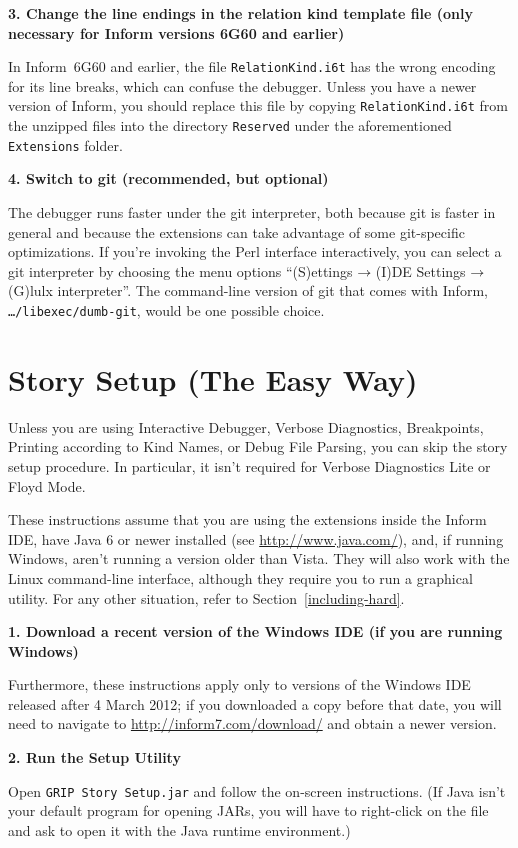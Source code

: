\documentclass{book}
\newcommand{\lastpagebreak}{\vfill\pagebreak}
\newcommand{\nil}{{\null}}
\newcommand{\thento}{\(\nil\rightarrow\nil\)}
\newcommand{\impatiencesection}[1]{\section{#1}\addcontentsline{toi}{section}{#1}}
\begin{document}
\textbf{3. Change the line endings in the relation kind template file (only
  necessary for Inform versions 6G60 and earlier)}

In Inform~6G60 and earlier, the file \texttt{RelationKind.i6t} has the wrong
encoding for its line breaks, which can confuse the debugger.  Unless you have a
newer version of Inform, you should replace this file by copying
\texttt{RelationKind.i6t} from the unzipped files into the directory
\texttt{Reserved} under the aforementioned \texttt{Extensions} folder.

\textbf{4. Switch to git (recommended, but optional)}

The debugger runs faster under the git interpreter, both because git is faster
in general and because the extensions can take advantage of some git-specific
optimizations.  If you're invoking the Perl interface interactively, you can
select a git interpreter by choosing the menu options ``(S)ettings\thento (I)DE
Settings\thento (G)lulx interpreter''.  The command-line version of git that
comes with Inform, \texttt{\dots/libexec/dumb-git}, would be one possible
choice.

\lastpagebreak

\impatiencesection{Story Setup (The Easy Way)}
\label{including-easy}

Unless you are using Interactive Debugger, Verbose Diagnostics, Breakpoints,
Printing according to Kind Names, or Debug File Parsing, you can skip the story
setup procedure.  In particular, it isn't required for Verbose Diagnostics Lite
or Floyd Mode.

These instructions assume that you are using the extensions inside the Inform
IDE, have Java 6 or newer installed (see \url{http://www.java.com/}), and, if
running Windows, aren't running a version older than Vista.  They will also work
with the Linux command-line interface, although they require you to run a
graphical utility.  For any other situation, refer to
Section~\ref{including-hard}.

\textbf{1. Download a recent version of the Windows IDE (if you are running Windows)}

Furthermore, these instructions apply only to versions of the Windows IDE
released after 4 March 2012; if you downloaded a copy before that date, you will
need to navigate to \url{http://inform7.com/download/} and obtain a newer
version.

\textbf{2. Run the Setup Utility}

Open \texttt{GRIP Story Setup.jar} and follow the on-screen instructions.  (If
Java isn't your default program for opening JARs, you will have to right-click
on the file and ask to open it with the Java runtime environment.)
\end{document}
